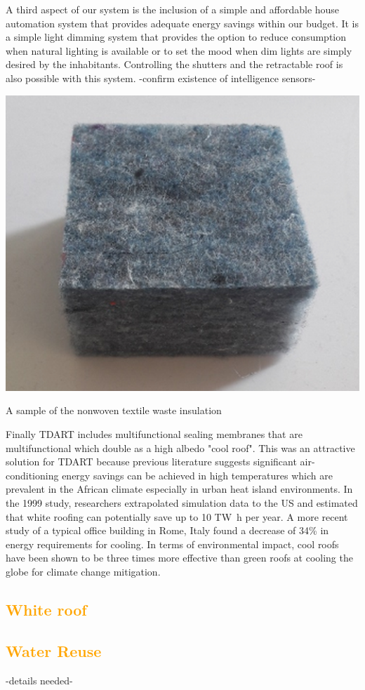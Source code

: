 \documentclass[justified]{tufte-book}
\begin{document}
\par
A third aspect of our system is the inclusion of a simple and affordable house automation system that provides adequate energy savings within our budget. It is a simple light dimming system that provides the option to reduce consumption when natural lighting is available or to set the mood when dim lights are simply desired by the inhabitants. Controlling the shutters and the retractable roof is also possible with this system.
-confirm existence of intelligence sensors-

\begin{marginfigure}
    \includegraphics[width=\textwidth]{insul}
    \caption{A sample of the nonwoven textile waste insulation}
\end{marginfigure}

\par Finally TDART includes multifunctional sealing %
membranes that are multifunctional which double as a high albedo "cool roof". This was an attractive solution for TDART because previous literature suggests significant air-conditioning energy savings can be achieved in high temperatures which are prevalent in the African climate\cite{akbari2003measured, akbari1999cooling} especially in urban heat island environments. In the 1999 study, researchers extrapolated simulation data to the US and estimated that white roofing can potentially save up to 10 \si{{\tera\watt\hour}} per year. A more recent study\cite{pisello2013active} of a typical office building in Rome, Italy found a decrease of 34\% in energy requirements for cooling. In terms of environmental impact, cool roofs have been shown to be three times more effective than green roofs at cooling the globe for climate change mitigation\cite{sproul2014economic}.

	\textcolor{orange}{\chapter{White roof}}
	\par

	\textcolor{orange}{\chapter{Water Reuse}}
	-details needed-
	
	
	
	
\end{document}
